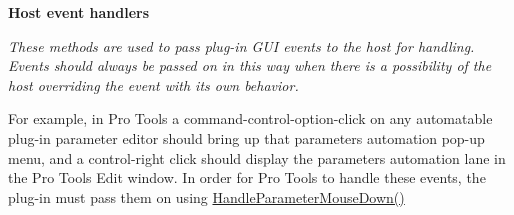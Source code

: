 \begin{Indent}{\bf Host event handlers}\par
{\em These methods are used to pass plug-\/in G\+U\+I events to the host for handling. Events should always be passed on in this way when there is a possibility of the host overriding the event with its own behavior.

For example, in Pro Tools a command-\/control-\/option-\/click on any automatable plug-\/in parameter editor should bring up that parameter\textquotesingle{}s automation pop-\/up menu, and a control-\/right click should display the parameter\textquotesingle{}s automation lane in the Pro Tools Edit window. In order for Pro Tools to handle these events, the plug-\/in must pass them on using \hyperlink{a00117_a75bdb733456034a6dde5eea2043569d4}{Handle\+Parameter\+Mouse\+Down()}

}
\end{Indent}
